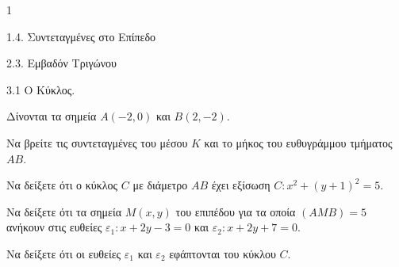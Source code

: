 \begin{ylh}{1}
    \item 1.4. Συντεταγμένες στο Επίπεδο
    \item 2.3. Εμβαδόν Τριγώνου
    \item 3.1 Ο Κύκλος.
\end{ylh}
Δίνονται τα σημεία $A(-2,0)$ και $B(2,-2)$.
\begin{alist}
\item Να βρείτε τις συντεταγμένες του μέσου $K$ και το μήκος του ευθυγράμμου τμήματος $AB$. 
\item Να δείξετε ότι ο κύκλος $C$ με διάμετρο $AB$ έχει εξίσωση $C: x^2 + (y + 1)^2 = 5$. 
\item Να δείξετε ότι τα σημεία $M(x,y)$ του επιπέδου για τα οποία $(AMB) = 5$ ανήκουν στις ευθείες $\varepsilon_1: x + 2y - 3 = 0$ και $\varepsilon_2: x + 2y + 7 = 0$. 
\item Να δείξετε ότι οι ευθείες $\varepsilon_1$ και $\varepsilon_2$ εφάπτονται του κύκλου $C$. 
\end{alist}